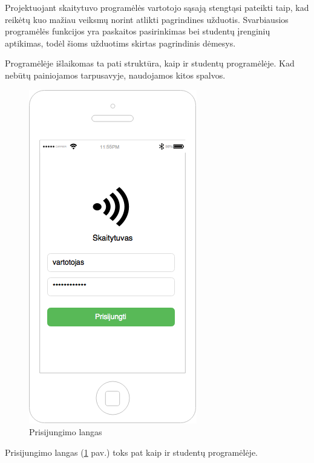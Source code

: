 \documentclass{VUMIFPSkursinis}
\begin{document}
Projektuojant skaitytuvo programėlės vartotojo sąsają stengtąsi pateikti taip, kad reikėtų kuo mažiau veiksmų norint atlikti pagrindines užduotis. Svarbiausios programėlės funkcijos yra paskaitos pasirinkimas bei studentų įrenginių aptikimas, todėl šioms užduotims skirtas pagrindinis dėmesys.

Programėlėje išlaikomas ta pati struktūra, kaip ir studentų programėlėje. Kad nebūtų painiojamos tarpusavyje, naudojamos kitos spalvos.

\begin{figure}[H]
	\centering
	\includegraphics[scale=0.5]{img/kursinio_app_dest_login}
	\caption{Prisijungimo langas}
	\label{img:scannerLoginView}
\end{figure}

Prisijungimo langas (\ref{img:scannerLoginView} pav.) toks pat kaip ir studentų programėlėje.
\end{document}
